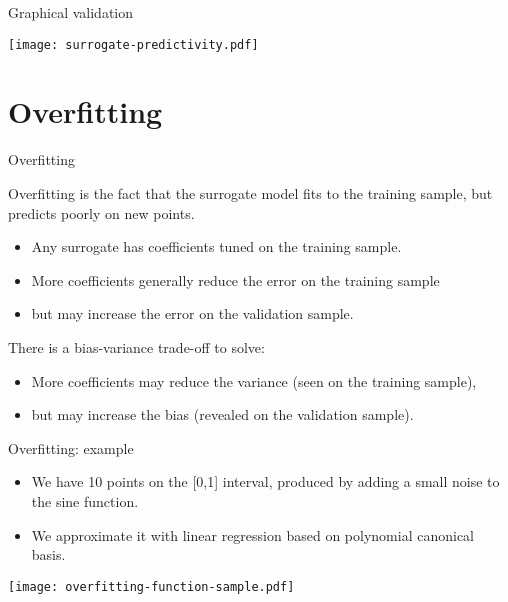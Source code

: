 \documentclass{beamer}
\begin{document}

\begin{frame}[t]{Graphical validation}

\begin{center}
 \texttt{[image: surrogate-predictivity.pdf]}
\end{center}

\end{frame}

\section{Overfitting}

\begin{frame}[t]{Overfitting}

Overfitting is the fact that the surrogate model fits to the 
training sample, but predicts poorly on new points. 

\begin{itemize}
\item Any surrogate has coefficients tuned on the training sample.
\item More coefficients generally reduce the error on the training sample 
\item but may increase the error on the validation sample.
\end{itemize}

There is a bias-variance trade-off to solve:
\begin{itemize}
\item More coefficients may reduce the variance (seen on the training sample), 
\item but may increase the bias (revealed on the validation sample).
\end{itemize}

\end{frame}
%

\begin{frame}[t]{Overfitting: example}

\begin{example}
\begin{itemize}
\item We have 10 points on the [0,1] interval, produced by 
adding a small noise to the sine function. 
\item We approximate it with linear regression based on polynomial 
canonical basis.
\end{itemize}
\end{example}

\begin{center}
 \texttt{[image: overfitting-function-sample.pdf]}
\end{center}

\end{frame}
\end{document}
